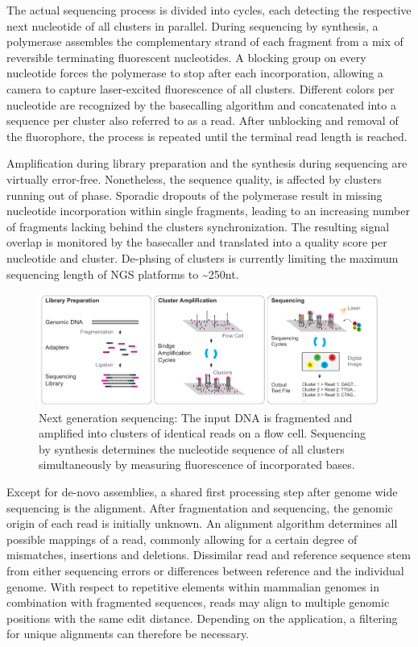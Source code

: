 The actual sequencing process is divided into cycles, each detecting the respective next nucleotide of all clusters in parallel.
During sequencing by synthesis, a polymerase assembles the complementary strand of each fragment from a mix of reversible terminating fluorescent nucleotides.
A blocking group on every nucleotide forces the polymerase to stop after each incorporation, allowing a camera to capture laser-excited fluorescence of all clusters.
Different colors per nucleotide are recognized by the basecalling algorithm and concatenated into a sequence per cluster also referred to as a read.
After unblocking and removal of the fluorophore, the process is repeated until the terminal read length is reached.

Amplification during library preparation and the synthesis during sequencing are virtually error-free.
Nonetheless, the sequence quality, is affected by clusters running out of phase. 
Sporadic dropouts of the polymerase result in missing nucleotide incorporation within single fragments, leading to an increasing number of fragments lacking behind the clusters synchronization.
The resulting signal overlap is monitored by the basecaller and translated into a quality score per nucleotide and cluster.
De-phsing of clusters is currently limiting the maximum sequencing length of NGS platforms to \textasciitilde250nt.

\begin{figure}[h]
	\centering
	\includegraphics[width=1.0\textwidth]{figures/intro/sbs.pdf}
	\captionsetup{format=plain}
	\caption[Sequencing by synthesis]{Next generation sequencing: The input DNA is fragmented and amplified into clusters of identical reads on a flow cell. Sequencing by synthesis determines the nucleotide sequence of all clusters simultaneously by measuring fluorescence of incorporated bases.}
	\label{fig:intro:sbs}
\end{figure}

Except for de-novo assemblies, a shared first processing step after genome wide sequencing is the alignment.
After fragmentation and sequencing, the genomic origin of each read is initially unknown.
An alignment algorithm determines all possible mappings of a read, commonly allowing for a certain degree of mismatches, insertions and deletions.
Dissimilar read and reference sequence stem from either sequencing errors or differences between reference and the individual genome.
With respect to repetitive elements within mammalian genomes in combination with fragmented sequences, reads may align to multiple genomic positions with the same edit distance.
Depending on the application, a filtering for unique alignments can therefore be necessary.

